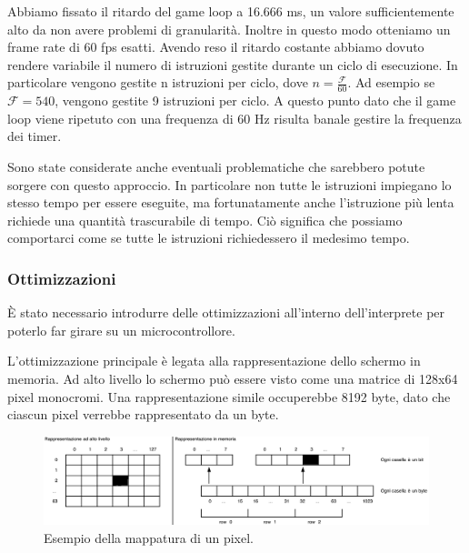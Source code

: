 \documentclass[a4paper]{article}
\begin{document}
Abbiamo fissato il ritardo del game loop a 16.666 ms, un valore sufficientemente alto da non avere problemi di granularità. Inoltre in questo modo otteniamo un frame rate di 60 fps esatti. Avendo reso il ritardo costante abbiamo dovuto rendere variabile il numero di istruzioni gestite durante un ciclo di esecuzione. In particolare vengono gestite n istruzioni per ciclo, dove $n = \frac{\mathcal{F}}{60}$. Ad esempio se $\mathcal{F} = 540$, vengono gestite 9 istruzioni per ciclo. A questo punto dato che il game loop viene ripetuto con una frequenza di 60 Hz risulta banale gestire la frequenza dei timer.

Sono state considerate anche eventuali problematiche che sarebbero potute sorgere con questo approccio. In particolare non tutte le istruzioni impiegano lo stesso tempo per essere eseguite, ma fortunatamente anche l'istruzione più lenta richiede una quantità trascurabile di tempo. Ciò significa che possiamo comportarci come se tutte le istruzioni richiedessero il medesimo tempo.

\subsubsection{Ottimizzazioni}


È stato necessario introdurre delle ottimizzazioni all'interno dell'interprete per poterlo far girare su un microcontrollore.

L'ottimizzazione principale è legata alla rappresentazione dello schermo in memoria. Ad alto livello lo schermo può essere visto come una matrice di 128x64 pixel monocromi. Una rappresentazione simile occuperebbe 8192 byte, dato che ciascun pixel verrebbe rappresentato da un byte.

\begin{figure}[h!t]
    \begin{center}
        \includegraphics[scale=0.38]{figures/screenopt_small.pdf}
    \end{center}
    \caption{Esempio della mappatura di un pixel.}
    \label{fig:screenopt}
\end{figure}
\end{document}
